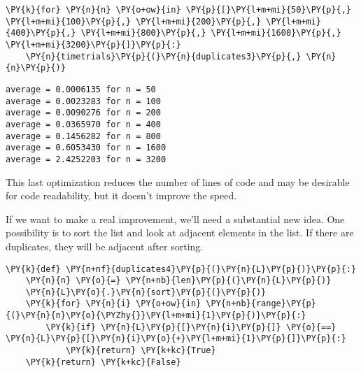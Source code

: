 \begin{Verbatim}[commandchars=\\\{\}]
\PY{k}{for} \PY{n}{n} \PY{o+ow}{in} \PY{p}{[}\PY{l+m+mi}{50}\PY{p}{,} \PY{l+m+mi}{100}\PY{p}{,} \PY{l+m+mi}{200}\PY{p}{,} \PY{l+m+mi}{400}\PY{p}{,} \PY{l+m+mi}{800}\PY{p}{,} \PY{l+m+mi}{1600}\PY{p}{,} \PY{l+m+mi}{3200}\PY{p}{]}\PY{p}{:}
    \PY{n}{timetrials}\PY{p}{(}\PY{n}{duplicates3}\PY{p}{,} \PY{n}{n}\PY{p}{)}
\end{Verbatim}

\begin{Verbatim}
average = 0.0006135 for n = 50
average = 0.0023283 for n = 100
average = 0.0090276 for n = 200
average = 0.0365970 for n = 400
average = 0.1456282 for n = 800
average = 0.6053430 for n = 1600
average = 2.4252203 for n = 3200

\end{Verbatim}


This last optimization reduces the number of lines of code and may be desirable for code readability, but it doesn't improve the speed.


If we want to make a real improvement, we'll need a substantial new idea.
One possibility is to sort the list and look at adjacent elements in the list.
If there are duplicates, they will be adjacent after sorting.

\begin{Verbatim}[commandchars=\\\{\}]
\PY{k}{def} \PY{n+nf}{duplicates4}\PY{p}{(}\PY{n}{L}\PY{p}{)}\PY{p}{:}
    \PY{n}{n} \PY{o}{=} \PY{n+nb}{len}\PY{p}{(}\PY{n}{L}\PY{p}{)}
    \PY{n}{L}\PY{o}{.}\PY{n}{sort}\PY{p}{(}\PY{p}{)}
    \PY{k}{for} \PY{n}{i} \PY{o+ow}{in} \PY{n+nb}{range}\PY{p}{(}\PY{n}{n}\PY{o}{\PYZhy{}}\PY{l+m+mi}{1}\PY{p}{)}\PY{p}{:}
        \PY{k}{if} \PY{n}{L}\PY{p}{[}\PY{n}{i}\PY{p}{]} \PY{o}{==} \PY{n}{L}\PY{p}{[}\PY{n}{i}\PY{o}{+}\PY{l+m+mi}{1}\PY{p}{]}\PY{p}{:}
            \PY{k}{return} \PY{k+kc}{True}
    \PY{k}{return} \PY{k+kc}{False}
\end{Verbatim}


